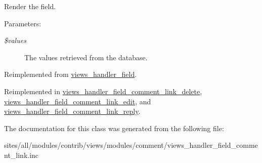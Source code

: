 Render the field.

\begin{Desc}
\item[Parameters:]
\begin{description}
\item[{\em \$values}]The values retrieved from the database. \end{description}
\end{Desc}


Reimplemented from \hyperlink{classviews__handler__field_82ff951c5e9ceb97b2eab86f880cbc1e}{views\_\-handler\_\-field}.

Reimplemented in \hyperlink{classviews__handler__field__comment__link__delete_02265dfa1540e77c5d4c1792d36f4900}{views\_\-handler\_\-field\_\-comment\_\-link\_\-delete}, \hyperlink{classviews__handler__field__comment__link__edit_e48ccec698d22ef50b68d4fd48ed1676}{views\_\-handler\_\-field\_\-comment\_\-link\_\-edit}, and \hyperlink{classviews__handler__field__comment__link__reply_5396a9f0f1101774c721f54600fafbda}{views\_\-handler\_\-field\_\-comment\_\-link\_\-reply}.

The documentation for this class was generated from the following file:\begin{CompactItemize}
\item 
sites/all/modules/contrib/views/modules/comment/views\_\-handler\_\-field\_\-comment\_\-link.inc\end{CompactItemize}
